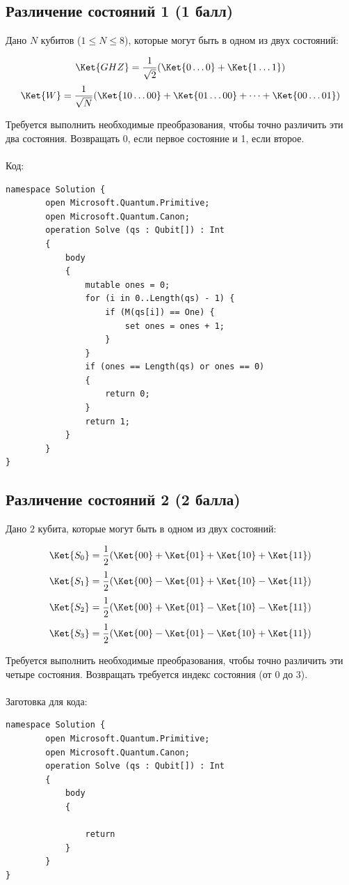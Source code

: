 \documentclass[a4paper,12pt]{article}
\begin{document}
\subsection{Различение состояний 1 (1 балл)}

Дано $N$ кубитов ($1 \le N \le 8$), которые могут быть в одном из двух состояний:

$$\Ket{GHZ} = \frac{1}{\sqrt2}(\Ket{0\dots0} +\Ket{1\dots1})$$
$$\Ket{W} = \frac{1}{\sqrt N}(\Ket{10\dots00}+\Ket{01\dots00} + \dots +\Ket{00\dots01})$$

Требуется выполнить необходимые преобразования, чтобы точно различить эти два состояния. Возвращать $0$, если первое состояние и 1, если второе. 
\\\\
Код:
\begin{lstlisting}
namespace Solution {
        open Microsoft.Quantum.Primitive;
        open Microsoft.Quantum.Canon;
        operation Solve (qs : Qubit[]) : Int
        {
            body
            {
                mutable ones = 0;
                for (i in 0..Length(qs) - 1) {
                    if (M(qs[i]) == One) {
                        set ones = ones + 1;
                    }
                }
                if (ones == Length(qs) or ones == 0)
                {
                    return 0;
                }
                return 1;
            }
        }
}
\end{lstlisting}


\subsection{Различение состояний 2 (2 балла)}

Дано $2$ кубита, которые могут быть в одном из двух состояний:

$$\Ket{S_0} = \frac{1}{2}(\Ket{00} + \Ket{01} + \Ket{10} + \Ket{11})$$
$$\Ket{S_1} = \frac{1}{2}(\Ket{00} - \Ket{01} + \Ket{10} - \Ket{11})$$
$$\Ket{S_2} = \frac{1}{2}(\Ket{00} + \Ket{01} - \Ket{10} - \Ket{11})$$
$$\Ket{S_3} = \frac{1}{2}(\Ket{00} - \Ket{01} - \Ket{10} + \Ket{11})$$


Требуется выполнить необходимые преобразования, чтобы точно различить эти четыре состояния. Возвращать требуется индекс состояния (от $0$ до $3$). 
\\\\
Заготовка для кода:
\begin{lstlisting}
namespace Solution {
        open Microsoft.Quantum.Primitive;
        open Microsoft.Quantum.Canon;
        operation Solve (qs : Qubit[]) : Int
        {
            body
            {

                return 
            }
        }
}
\end{lstlisting}
\end{document}
